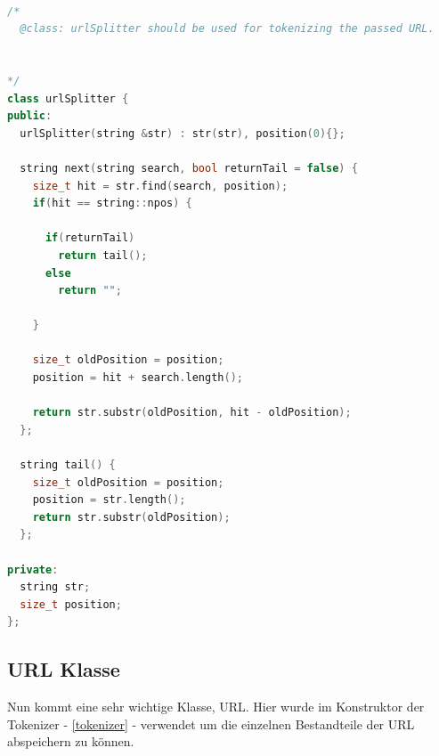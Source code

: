 \documentclass{article}
\begin{document}
\begin{lstlisting}[language=C++]

/*
  @class: urlSplitter should be used for tokenizing the passed URL.


*/
class urlSplitter {
public:
  urlSplitter(string &str) : str(str), position(0){};

  string next(string search, bool returnTail = false) {
    size_t hit = str.find(search, position);
    if(hit == string::npos) {

      if(returnTail)
        return tail();
      else 
        return "";

    }

    size_t oldPosition = position;
    position = hit + search.length();

    return str.substr(oldPosition, hit - oldPosition);
  };

  string tail() {
    size_t oldPosition = position;
    position = str.length();
    return str.substr(oldPosition);
  };

private:
  string str;
  size_t position;
};
\end{lstlisting}

\subsection{URL Klasse}
Nun kommt eine sehr wichtige Klasse, URL. Hier wurde im Konstruktor der Tokenizer - \ref{tokenizer} - verwendet um die einzelnen Bestandteile der URL abspeichern zu können.
\end{document}
